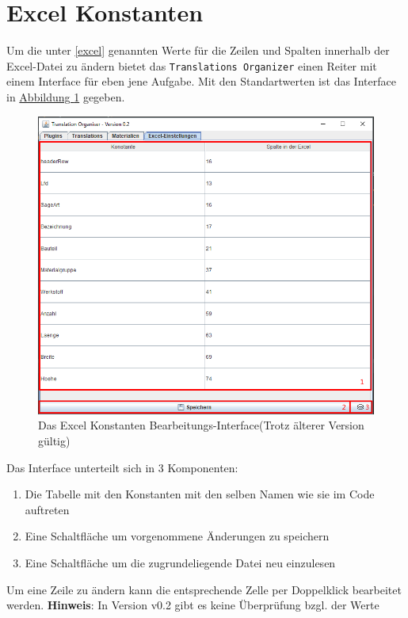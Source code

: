 \documentclass{book}
\newcommand{\assisttool}{\texttt{Translations Organizer}\xspace}
\newcommand{\hinweis}[1]{\newline \textbf{Hinweis}: #1 \newline}
\begin{document}
	 	\section{Excel Konstanten}\label{excel konstanten}
			 Um die unter \ref{excel} genannten Werte für die Zeilen und Spalten innerhalb der Excel-Datei zu ändern bietet das \assisttool einen Reiter mit einem Interface für eben jene Aufgabe. Mit den Standartwerten ist das Interface in \hyperref[fig:excel constants]{Abbildung \ref{fig:excel constants}} gegeben.
		 	\begin{figure}[H]
		 		\centering
		 		\includegraphics[scale=0.48]{pics/assisttool/excel-konstanten.PNG}
		 		\caption{Das Excel Konstanten Bearbeitungs-Interface\newline (Trotz älterer Version gültig)}
		 		\label{fig:excel constants}
		 	\end{figure}
		 	Das Interface unterteilt sich in 3 Komponenten:
			 	\begin{enumerate}
			 		\item Die Tabelle mit den Konstanten mit den selben Namen wie sie im Code auftreten
			 		\item Eine Schaltfläche um vorgenommene Änderungen zu speichern
			 		\item Eine Schaltfläche um die zugrundeliegende Datei neu einzulesen
			 	\end{enumerate}
		 	
		 	Um eine Zeile zu ändern kann die entsprechende Zelle per Doppelklick bearbeitet werden.
		 	\hinweis{In Version v0.2 gibt es keine Überprüfung bzgl. der Werte}
	 	
\end{document}
